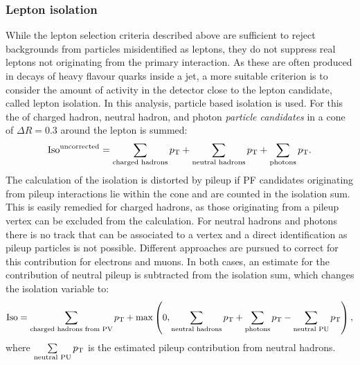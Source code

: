 \subsubsection{Lepton isolation}
While the lepton selection criteria described above are sufficient to reject backgrounds from particles misidentified as leptons, they do not suppress real leptons not originating from the primary interaction. As these are often produced in decays of heavy flavour quarks inside a jet, a more suitable criterion is to consider the amount of activity in the detector close to the lepton candidate, called lepton isolation. In this analysis, particle based isolation is used. For this the \pt of charged hadron, neutral hadron, and photon \textit{particle candidates} in a cone of $\Delta R = 0.3$ around the lepton is summed:
\begin{equation}
\text{Iso}^{\text{uncorrected}} = \sum\limits_{\text{charged hadrons}} p_{\mathrm{T}} + \sum\limits_{\text{neutral hadrons}} p_{\mathrm{T}} + \sum\limits_{\text{photons}} p_{\mathrm{T}}.
\end{equation}
The calculation of the isolation is distorted by pileup if PF candidates originating from pileup interactions lie within the cone and are counted in the isolation sum. This is easily remedied for charged hadrons, as those originating from a pileup vertex can be excluded from the calculation. For neutral hadrons and photons there is no track that can be associated to a vertex and a direct identification as pileup particles is not possible. Different approaches are pursued to correct for this contribution for electrons and muons. In both cases, an estimate for the contribution of neutral pileup is subtracted from the isolation sum, which changes the isolation variable to:
\begin{equation}
\text{Iso} = \sum\limits_{\text{charged hadrons from PV}} p_{\mathrm{T}} + \max\left(0, \sum\limits_{\text{neutral hadrons}} p_{\mathrm{T}} + \sum\limits_{\text{photons}} p_{\mathrm{T}} - \sum\limits_{\text{neutral PU}} p_{\mathrm{T}}\right), 
\label{eq:iso}
\end{equation}
where $\sum\limits_{\text{neutral PU}} p_{\mathrm{T}}$ is the estimated pileup contribution from neutral hadrons.

